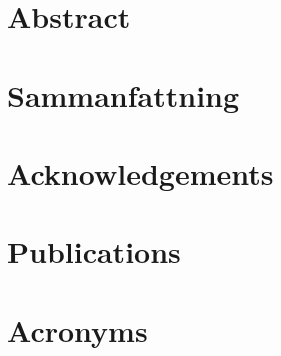 \documentclass[english]{his-thesis}
\begin{document}

\maketitle

\cleardoublepage
{}%
\setcounter{page}{1}%
\pagestyle{headings}

\frontmatter

\chapter*{Abstract}
\lipsum[1]


\chapter*{Sammanfattning}
\lipsum[1]


\chapter*{Acknowledgements}
\lipsum[1]


\chapter*{Publications}
\label{sec:publications-list}
%


\tableofcontents
\listoffigures
\listoftables


\chapter*{Acronyms}
\printglossary[type=\acronymtype, nonumberlist]




\cleardoublepage
{}%
\setcounter{page}{1}%
\pagestyle{headings}


\end{document}
